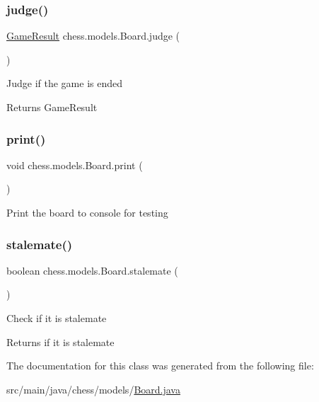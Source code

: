 \subsubsection{\texorpdfstring{judge()}{judge()}}
{\footnotesize\ttfamily \mbox{\hyperlink{enumchess_1_1models_1_1enums_1_1_game_result}{Game\+Result}} chess.\+models.\+Board.\+judge (\begin{DoxyParamCaption}{ }\end{DoxyParamCaption})}

Judge if the game is ended

\begin{DoxyReturn}{Returns}
Game\+Result 
\end{DoxyReturn}
\mbox{\label{classchess_1_1models_1_1_board_af22da20d051a6cc31c6730e5dc80d81e}} 
\subsubsection{\texorpdfstring{print()}{print()}}
{\footnotesize\ttfamily void chess.\+models.\+Board.\+print (\begin{DoxyParamCaption}{ }\end{DoxyParamCaption})}

Print the board to console for testing \mbox{\label{classchess_1_1models_1_1_board_aca772c3b56248d6e3fbf97d00a9abaf9}} 
\subsubsection{\texorpdfstring{stalemate()}{stalemate()}}
{\footnotesize\ttfamily boolean chess.\+models.\+Board.\+stalemate (\begin{DoxyParamCaption}{ }\end{DoxyParamCaption})}

Check if it is stalemate

\begin{DoxyReturn}{Returns}
if it is stalemate 
\end{DoxyReturn}


The documentation for this class was generated from the following file\+:\begin{DoxyCompactItemize}
\item 
src/main/java/chess/models/\mbox{\hyperlink{_board_8java}{Board.\+java}}\end{DoxyCompactItemize}
